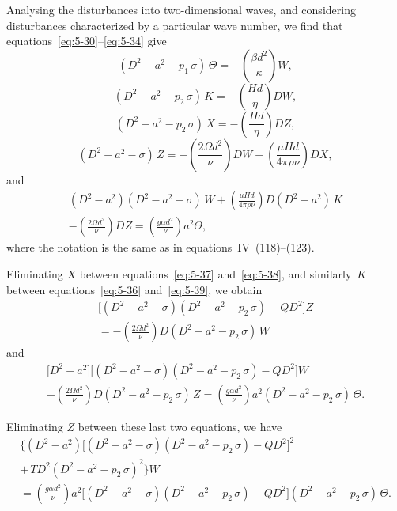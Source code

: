 Analysing the disturbances into two-dimensional waves, and considering
disturbances characterized by a particular wave number, we find that
equations~\eqref{eq:5-30}--\eqref{eq:5-34} give
\begin{equation}
  (D^{2}-a^{2}-p_1\,\sigma)\,\Theta
  = -\left(\frac{\beta d^{2}}{\kappa}\right)W,
  \label{eq:5-35}
\end{equation}
\begin{equation}
  (D^{2}-a^{2}-p_2\,\sigma)\,K
  = -\left(\frac{Hd}{\eta}\right)DW,
  \label{eq:5-36}
\end{equation}
\begin{equation}
  (D^{2}-a^{2}-p_2\,\sigma)\,X
  = -\left(\frac{Hd}{\eta}\right)DZ,
  \label{eq:5-37}
\end{equation}
\begin{equation}
  (D^{2}-a^{2}-\sigma)\,Z
  = -\left(\frac{2\Omega d^{2}}{\nu}\right)DW
  - \left(\frac{\mu Hd}{4\pi\rho\nu}\right)DX,
  \label{eq:5-38}
\end{equation}
and
\begin{multline}
  (D^{2}-a^{2})
  (D^{2}-a^{2}-\sigma)\,W
  + \left(\frac{\mu Hd}{4\pi\rho\nu}\right)
  D(D^{2}-a^{2})\,K \\
  - \left(\frac{2\Omega d^{2}}{\nu}\right)DZ
  = \left(\frac{g\alpha d^{2}}{\nu}\right)a^{2}\Theta,
  \label{eq:5-39}
\end{multline}
where the notation is the same as in equations~IV~(118)--(123).

Eliminating $X$ between equations~\eqref{eq:5-37} and~\eqref{eq:5-38},
and similarly~$K$ between equations~\eqref{eq:5-36}
and~\eqref{eq:5-39}, we obtain
\begin{multline}
  \bigl[(D^{2}-a^{2}-\sigma)(D^{2}-a^{2}-p_2\,\sigma)
    -QD^{2}\bigr]Z \\
  = -\left(\frac{2\Omega d^{2}}{\nu}\right)
  D(D^{2}-a^{2}-p_2\,\sigma)\,W
  \label{eq:5-40}
\end{multline}
and
\begin{multline}
  \bigl[D^{2}-a^{2}\bigr]
  \bigl[(D^{2}-a^{2}-\sigma)(D^{2}-a^{2}-p_2\,\sigma)
    -QD^{2}\bigr]W \\
  -\left(\frac{2\Omega d^{2}}{\nu}\right)
  D(D^{2}-a^{2}-p_2\,\sigma)\,Z
  = \left(\frac{g\alpha d^{2}}{\nu}\right)
  a^{2}(D^{2}-a^{2}-p_2\,\sigma)\,\Theta.
  \label{eq:5-41}
\end{multline}

Eliminating $Z$ between these last two equations, we have
\begin{multline}
  \bigl\{(D^{2}\!-\!a^{2})
    \bigl[(D^{2}\!-\!a^{2}\!-\!\sigma)(D^{2}\!-\!a^{2}\!-\!p_2\,\sigma)
      -QD^{2}\bigr]^{2} \\
  +\,T D^{2}(D^{2}\!-\!a^{2}\!-\!p_2\,\sigma)^{2}\bigr\}W \\
  = \left(\frac{g\alpha d^{2}}{\nu}\right)
  a^{2}\bigl[(D^{2}\!-\!a^{2}\!-\!\sigma)(D^{2}\!-\!a^{2}\!-\!p_2\,\sigma)
    -QD^{2}\bigr]
  (D^{2}\!-\!a^{2}\!-\!p_2\,\sigma)\,\Theta.
  \label{eq:5-42}
\end{multline}

